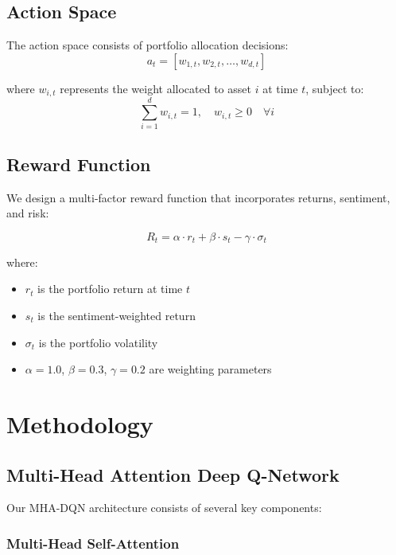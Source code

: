 \documentclass[11pt,twocolumn]{article}
\theoremstyle{definition}
\begin{document}
\subsection{Action Space}

The action space consists of portfolio allocation decisions:
\begin{equation}
a_t = [w_{1,t}, w_{2,t}, \ldots, w_{d,t}]
\end{equation}

where $w_{i,t}$ represents the weight allocated to asset $i$ at time $t$, subject to:
\begin{equation}
\sum_{i=1}^d w_{i,t} = 1, \quad w_{i,t} \geq 0 \quad \forall i
\end{equation}

\subsection{Reward Function}

We design a multi-factor reward function that incorporates returns, sentiment, and risk:

\begin{equation}
R_t = \alpha \cdot r_t + \beta \cdot s_t - \gamma \cdot \sigma_t
\end{equation}

where:
\begin{itemize}
\item $r_t$ is the portfolio return at time $t$
\item $s_t$ is the sentiment-weighted return
\item $\sigma_t$ is the portfolio volatility
\item $\alpha = 1.0$, $\beta = 0.3$, $\gamma = 0.2$ are weighting parameters
\end{itemize}

\section{Methodology}

\subsection{Multi-Head Attention Deep Q-Network}

Our MHA-DQN architecture consists of several key components:

\subsubsection{Multi-Head Self-Attention}
\end{document}
